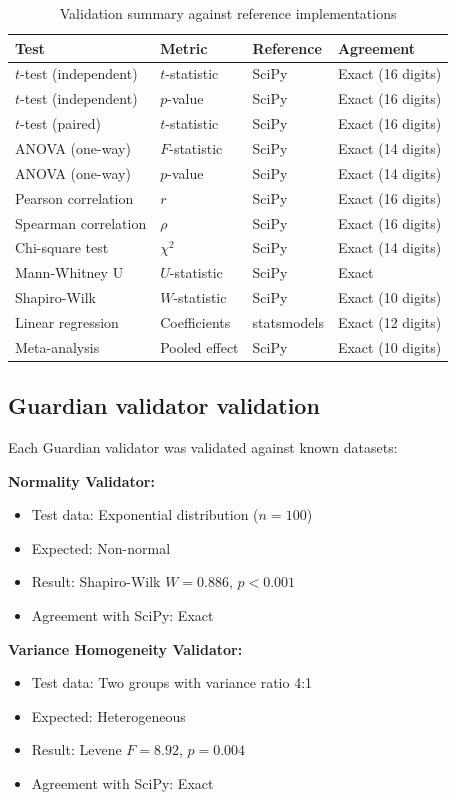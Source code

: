 \documentclass[article]{jss}
\begin{document}
\begin{table}[htbp]
\centering
\caption{Validation summary against reference implementations}
\label{tab:validation}
\begin{tabular}{llll}
\toprule
Test & Metric & Reference & Agreement \\
\midrule
$t$-test (independent) & $t$-statistic & SciPy & Exact (16 digits) \\
$t$-test (independent) & $p$-value & SciPy & Exact (16 digits) \\
$t$-test (paired) & $t$-statistic & SciPy & Exact (16 digits) \\
ANOVA (one-way) & $F$-statistic & SciPy & Exact (14 digits) \\
ANOVA (one-way) & $p$-value & SciPy & Exact (14 digits) \\
Pearson correlation & $r$ & SciPy & Exact (16 digits) \\
Spearman correlation & $\rho$ & SciPy & Exact (16 digits) \\
Chi-square test & $\chi^2$ & SciPy & Exact (14 digits) \\
Mann-Whitney U & $U$-statistic & SciPy & Exact \\
Shapiro-Wilk & $W$-statistic & SciPy & Exact (10 digits) \\
Linear regression & Coefficients & statsmodels & Exact (12 digits) \\
Meta-analysis & Pooled effect & SciPy & Exact (10 digits) \\
\bottomrule
\end{tabular}
\end{table}

\subsection{Guardian validator validation}

Each Guardian validator was validated against known datasets:

\textbf{Normality Validator:}
\begin{itemize}
\item Test data: Exponential distribution ($n=100$)
\item Expected: Non-normal
\item Result: Shapiro-Wilk $W = 0.886$, $p < 0.001$
\item Agreement with SciPy: Exact
\end{itemize}

\textbf{Variance Homogeneity Validator:}
\begin{itemize}
\item Test data: Two groups with variance ratio 4:1
\item Expected: Heterogeneous
\item Result: Levene $F = 8.92$, $p = 0.004$
\item Agreement with SciPy: Exact
\end{itemize}
\end{document}
